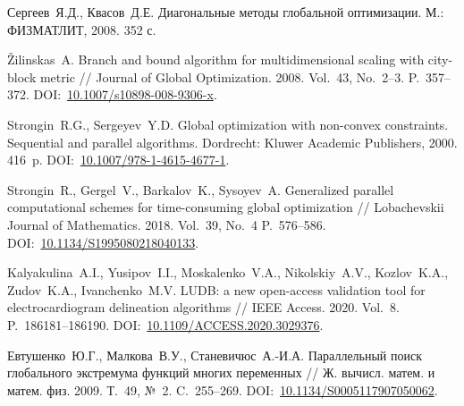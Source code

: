 \documentclass[11pt, oneside, a4paper]{article}
\begin{document}
\begin{biblio}
Сергеев~Я.Д., Квасов~Д.Е. Диагональные методы глобальной оптимизации. М.: ФИЗМАТЛИТ, 2008. 352 с.


Žilinskas~A. Branch and bound algorithm for multidimensional scaling with city-block metric // Journal of Global Optimization. 2008. Vol.~43, No.~2--3. P.~357--372. DOI:~\href{http://dx.doi.org/10.1007/s10898-008-9306-x}{10.1007/s10898-008-9306-x}.

Strongin~R.G., Sergeyev~Y.D. Global optimization with non-convex constraints. Sequential and parallel algorithms. Dordrecht: Kluwer Academic Publishers, 2000. 416~p. DOI:~\href{https://doi.org/10.1007/978-1-4615-4677-1}{10.1007/978-1-4615-4677-1}.

Strongin~R., Gergel~V., Barkalov~K., Sysoyev~A. Generalized parallel computational schemes for time-consuming global optimization //  Lobachevskii Journal of Mathematics. 2018. Vol.~39, No.~4 P.~576--586. DOI:~\href{http://dx.doi.org/10.1134/S1995080218040133}{10.1134/S1995080218040133}.

Kalyakulina~A.I., Yusipov~I.I., Moskalenko~V.A., Nikolskiy~A.V., Kozlov~K.A., Zudov~K.A., Ivanchenko~M.V. LUDB: a new open-access validation tool for electrocardiogram delineation algorithms // IEEE Access. 2020. Vol.~8. P.~186181--186190. DOI:~\href{https://doi.org/10.1109/ACCESS.2020.3029376}{10.1109/ACCESS.2020.3029376}.



Евтушенко~Ю.Г., Малкова~В.У., Станевичюс~А.-И.А. Параллельный поиск глобального экстремума функций многих переменных // Ж. вычисл. матем. и матем. физ. 2009. Т.~49, №~2. C.~255--269. DOI:~\href{https://doi.org/10.1134/S0005117907050062}{10.1134/S0005117907050062}.


\end{biblio}
\end{document}
